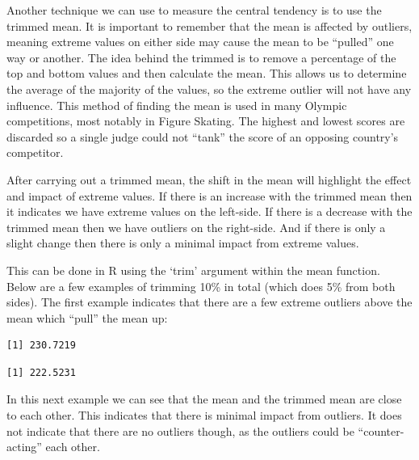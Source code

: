 \documentclass[
  letterpaper,
  DIV=11,
  numbers=noendperiod]{scrreprt}
\newenvironment{Shaded}{\begin{snugshade}}{\end{snugshade}}
\newcommand{\AttributeTok}[1]{\textcolor[rgb]{0.40,0.45,0.13}{#1}}
\newcommand{\DecValTok}[1]{\textcolor[rgb]{0.68,0.00,0.00}{#1}}
\newcommand{\FunctionTok}[1]{\textcolor[rgb]{0.28,0.35,0.67}{#1}}
\newcommand{\NormalTok}[1]{\textcolor[rgb]{0.00,0.23,0.31}{#1}}
\newcommand{\SpecialCharTok}[1]{\textcolor[rgb]{0.37,0.37,0.37}{#1}}
\begin{document}
Another technique we can use to measure the central tendency is to use
the trimmed mean. It is important to remember that the mean is affected
by outliers, meaning extreme values on either side may cause the mean to
be ``pulled'' one way or another. The idea behind the trimmed is to
remove a percentage of the top and bottom values and then calculate the
mean. This allows us to determine the average of the majority of the
values, so the extreme outlier will not have any influence. This method
of finding the mean is used in many Olympic competitions, most notably
in Figure Skating. The highest and lowest scores are discarded so a
single judge could not ``tank'' the score of an opposing country's
competitor.

After carrying out a trimmed mean, the shift in the mean will highlight
the effect and impact of extreme values. If there is an increase with
the trimmed mean then it indicates we have extreme values on the
left-side. If there is a decrease with the trimmed mean then we have
outliers on the right-side. And if there is only a slight change then
there is only a minimal impact from extreme values.

This can be done in R using the `trim' argument within the mean
function. Below are a few examples of trimming 10\% in total (which does
5\% from both sides). The first example indicates that there are a few
extreme outliers above the mean which ``pull'' the mean up:

\begin{Shaded}
\end{Shaded}

\begin{verbatim}
[1] 230.7219
\end{verbatim}

\begin{Shaded}
\end{Shaded}

\begin{verbatim}
[1] 222.5231
\end{verbatim}

In this next example we can see that the mean and the trimmed mean are
close to each other. This indicates that there is minimal impact from
outliers. It does not indicate that there are no outliers though, as the
outliers could be ``counter-acting'' each other.
\end{document}
